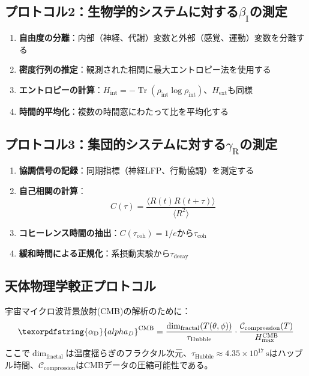 \documentclass[11pt,a4paper]{article}
\DeclareMathOperator{\Tr}{Tr}
\DeclareRobustCommand{\alD}{\texorpdfstring{\ensuremath{\alpha_{\mathrm{D}}}}{alpha_D}}
\DeclareRobustCommand{\beI}{\texorpdfstring{\ensuremath{\beta_{\mathrm{I}}}}{beta_I}}
\DeclareRobustCommand{\gaR}{\texorpdfstring{\ensuremath{\gamma_{\mathrm{R}}}}{gamma_R}}
\begin{document}
	\subsection{プロトコル2：生物学的システムに対する\beI の測定}
	
	\begin{enumerate}
		\item \textbf{自由度の分離}：内部（神経、代謝）変数と外部（感覚、運動）変数を分離する
		\item \textbf{密度行列の推定}：観測された相関に最大エントロピー法を使用する
		\item \textbf{エントロピーの計算}：\(H_{\mathrm{int}} = -\Tr(\rho_{\mathrm{int}}\log\rho_{\mathrm{int}})\)、\(H_{\mathrm{ext}}\)も同様
		\item \textbf{時間的平均化}：複数の時間窓にわたって比を平均化する
	\end{enumerate}
	
	\subsection{プロトコル3：集団的システムに対する\gaR の測定}
	
	\begin{enumerate}
		\item \textbf{協調信号の記録}：同期指標（神経LFP、行動協調）を測定する
		\item \textbf{自己相関の計算}：
		\[
		C(\tau) = \frac{\langle R(t)R(t+\tau)\rangle}{\langle R^2\rangle}
		\]
		\item \textbf{コヒーレンス時間の抽出}：\(C(\tau_{\mathrm{coh}}) = 1/e\)から\(\tau_{\mathrm{coh}}\)
		\item \textbf{緩和時間による正規化}：系摂動実験から\(\tau_{\mathrm{decay}}\)
	\end{enumerate}
	
	\subsection{天体物理学較正プロトコル}
	\label{subsec:astro-calibration}
	
	宇宙マイクロ波背景放射(CMB)の解析のために：
	\[
	\alD^{\mathrm{CMB}} = \frac{\dim_{\mathrm{fractal}}(T(\theta,\phi))}{\tau_{\mathrm{Hubble}}} \cdot \frac{\mathcal{C}_{\mathrm{compression}}(T)}{H_{\max}^{\mathrm{CMB}}}
	\]
	ここで\(\dim_{\mathrm{fractal}}\)は温度揺らぎのフラクタル次元、\(\tau_{\mathrm{Hubble}} \approx 4.35 \times 10^{17}\ \mathrm{s}\)はハッブル時間、\(\mathcal{C}_{\mathrm{compression}}\)はCMBデータの圧縮可能性である。
	
\end{document}
